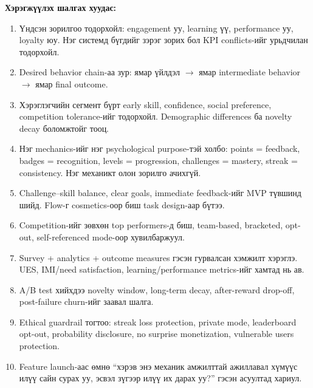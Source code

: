 \begin{sloppy}
\textbf{Хэрэгжүүлэх шалгах хуудас:}
\begin{enumerate}
  \item Үндсэн зорилгоо тодорхойл: engagement уу, learning үү, performance уу, loyalty юу. Нэг системд бүгдийг зэрэг зорих бол KPI conflicts-ийг урьдчилан тодорхойл.
  \item Desired behavior chain-аа зур: ямар үйлдэл $\to$ ямар intermediate behavior $\to$ ямар final outcome.
  \item Хэрэглэгчийн сегмент бүрт early skill, confidence, social preference, competition tolerance-ийг тодорхойл. Demographic differences ба novelty decay боломжтойг тооц.
  \item Нэг mechanics-ийг нэг psychological purpose-тэй холбо: points = feedback, badges = recognition, levels = progression, challenges = mastery, streak = consistency. Нэг механикт олон зорилго ачихгүй.
  \item Challenge--skill balance, clear goals, immediate feedback-ийг MVP түвшинд шийд. Flow-г cosmetics-оор биш task design-аар бүтээ.
  \item Competition-ийг зөвхөн top performers-д биш, team-based, bracketed, opt-out, self-referenced mode-оор хувилбаржуул.
  \item Survey + analytics + outcome measures гэсэн гурвалсан хэмжилт хэрэглэ. UES, IMI/need satisfaction, learning/performance metrics-ийг хамтад нь ав.
  \item A/B test хийхдээ novelty window, long-term decay, after-reward drop-off, post-failure churn-ийг заавал шалга.
  \item Ethical guardrail тогтоо: streak loss protection, private mode, leaderboard opt-out, probability disclosure, no surprise monetization, vulnerable users protection.
  \item Feature launch-аас өмнө ``хэрэв энэ механик амжилттай ажиллавал хүмүүс илүү сайн сурах уу, эсвэл зүгээр илүү их дарах уу?'' гэсэн асуултад хариул.
\end{enumerate}

\end{sloppy}


